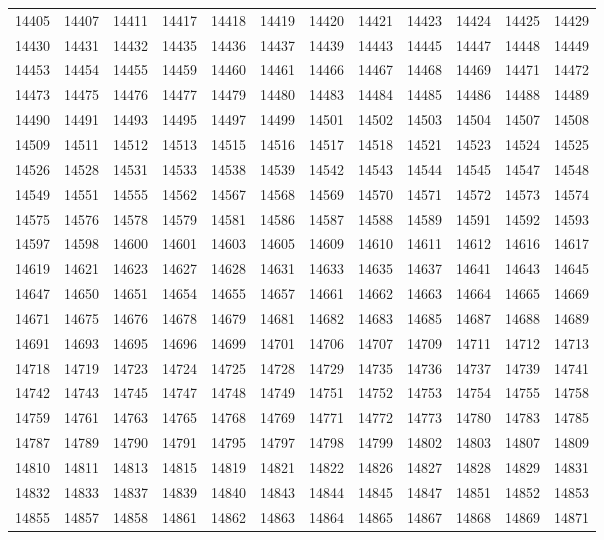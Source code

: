 \begin{center}
\begin{longtable}{llllllllllll}
14405 &14407 &14411 &14417 &14418 &14419 &14420 &14421 &14423 &14424 &14425 &14429 \\
14430 &14431 &14432 &14435 &14436 &14437 &14439 &14443 &14445 &14447 &14448 &14449 \\
14453 &14454 &14455 &14459 &14460 &14461 &14466 &14467 &14468 &14469 &14471 &14472 \\
14473 &14475 &14476 &14477 &14479 &14480 &14483 &14484 &14485 &14486 &14488 &14489 \\
14490 &14491 &14493 &14495 &14497 &14499 &14501 &14502 &14503 &14504 &14507 &14508 \\
14509 &14511 &14512 &14513 &14515 &14516 &14517 &14518 &14521 &14523 &14524 &14525 \\
14526 &14528 &14531 &14533 &14538 &14539 &14542 &14543 &14544 &14545 &14547 &14548 \\
14549 &14551 &14555 &14562 &14567 &14568 &14569 &14570 &14571 &14572 &14573 &14574 \\
14575 &14576 &14578 &14579 &14581 &14586 &14587 &14588 &14589 &14591 &14592 &14593 \\
14597 &14598 &14600 &14601 &14603 &14605 &14609 &14610 &14611 &14612 &14616 &14617 \\
14619 &14621 &14623 &14627 &14628 &14631 &14633 &14635 &14637 &14641 &14643 &14645 \\
14647 &14650 &14651 &14654 &14655 &14657 &14661 &14662 &14663 &14664 &14665 &14669 \\
14671 &14675 &14676 &14678 &14679 &14681 &14682 &14683 &14685 &14687 &14688 &14689 \\
14691 &14693 &14695 &14696 &14699 &14701 &14706 &14707 &14709 &14711 &14712 &14713 \\
14718 &14719 &14723 &14724 &14725 &14728 &14729 &14735 &14736 &14737 &14739 &14741 \\
14742 &14743 &14745 &14747 &14748 &14749 &14751 &14752 &14753 &14754 &14755 &14758 \\
14759 &14761 &14763 &14765 &14768 &14769 &14771 &14772 &14773 &14780 &14783 &14785 \\
14787 &14789 &14790 &14791 &14795 &14797 &14798 &14799 &14802 &14803 &14807 &14809 \\
14810 &14811 &14813 &14815 &14819 &14821 &14822 &14826 &14827 &14828 &14829 &14831 \\
14832 &14833 &14837 &14839 &14840 &14843 &14844 &14845 &14847 &14851 &14852 &14853 \\
14855 &14857 &14858 &14861 &14862 &14863 &14864 &14865 &14867 &14868 &14869 &14871 \\

\end{longtable}
\end{center}
